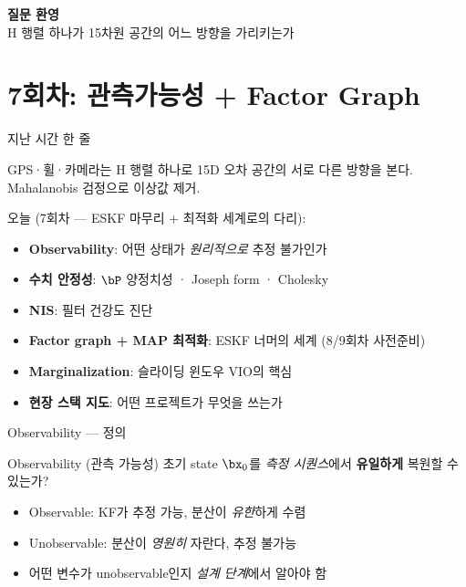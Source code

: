 \begin{frame}
  \vspace{1.5cm}
  \begin{center}
    {\Huge \textbf{질문 환영}}\\[1em]
    \large H 행렬 하나가 15차원 공간의 어느 방향을 가리키는가
  \end{center}
\end{frame}

\section{7회차: 관측가능성 + Factor Graph}


\begin{frame}{지난 시간 한 줄}
  \begin{center}
    \large
    GPS·휠·카메라는 H 행렬 하나로 15D 오차 공간의 서로 다른 방향을 본다.\\
    Mahalanobis 검정으로 이상값 제거.
  \end{center}
  \vspace{0.5em}
  오늘 (7회차 — ESKF 마무리 + 최적화 세계로의 다리):
  \begin{itemize}
    \item \textbf{Observability}: 어떤 상태가 \emph{원리적으로} 추정 불가인가
    \item \textbf{수치 안정성}: $\bP$ 양정치성 · Joseph form · Cholesky
    \item \textbf{NIS}: 필터 건강도 진단
    \item \textbf{Factor graph + MAP 최적화}: ESKF 너머의 세계 (8/9회차 사전준비)
    \item \textbf{Marginalization}: 슬라이딩 윈도우 VIO의 핵심
    \item \textbf{현장 스택 지도}: 어떤 프로젝트가 무엇을 쓰는가
  \end{itemize}
\end{frame}

\begin{frame}{Observability — 정의}
  \begin{block}{Observability (관측 가능성)}
    초기 state $\bx_0$를 \emph{측정 시퀀스}에서 \textbf{유일하게} 복원할 수 있는가?
  \end{block}
  \pause
  \vspace{0.4em}
  \begin{itemize}
    \item Observable: KF가 추정 가능, 분산이 \emph{유한}하게 수렴
    \item Unobservable: 분산이 \emph{영원히} 자란다, 추정 불가능
    \item 어떤 변수가 unobservable인지 \emph{설계 단계}에서 알아야 함
  \end{itemize}
\end{frame}

